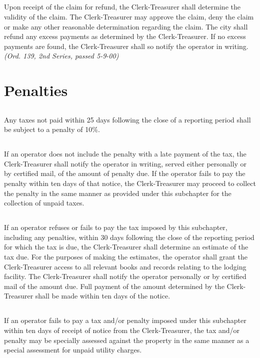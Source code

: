 \subsection{}
Upon receipt of the claim for refund, the Clerk-Treasurer shall determine the validity of the claim. The Clerk-Treasurer may approve the claim, deny the claim or make any other reasonable determination regarding the claim. The city shall refund any excess payments as determined by the Clerk-Treasurer. If no excess payments are found, the Clerk-Treasurer shall so notify the operator in writing.\newline
\emph{(Ord. 139, 2nd Series, passed 5-9-00)}

\section{Penalties}
\subsection{}
Any taxes not paid within 25 days following the close of a reporting period shall be subject to a penalty of 10\%.
\subsection{}
If an operator does not include the penalty with a late payment of the tax, the Clerk-Treasurer shall notify the operator in writing, served either personally or by certified mail, of the amount of penalty due. If the operator fails to pay the penalty within ten days of that notice, the Clerk-Treasurer may proceed to collect the penalty in the same manner as provided under this subchapter for the collection of unpaid taxes.
\subsection{}
If an operator refuses or fails to pay the tax imposed by this subchapter, including any penalties, within 30 days following the close of the reporting period for which the tax is due, the Clerk-Treasurer shall determine an estimate of the tax due. For the purposes of making the estimates, the operator shall grant the Clerk-Treasurer access to all relevant books and records relating to the lodging facility. The Clerk-Treasurer shall notify the operator personally or by certified mail of the amount due. Full payment of the amount determined by the Clerk-Treasurer shall be made within ten days of the notice.
\subsection{}
If an operator fails to pay a tax and/or penalty imposed under this subchapter within ten days of receipt of notice from the Clerk-Treasurer, the tax and/or penalty may be specially assessed against the property in the same manner as a special assessment for unpaid utility charges.
